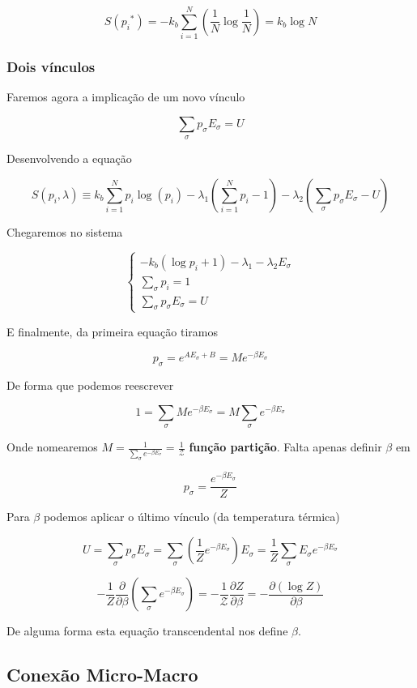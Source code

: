 \[
	S({p_i}^*) = - k_b \sum_{i=1}^{N} \left( \frac{1}{N} \log{\frac{1}{N}} \right) = k_b \log{N}
\]

\subsubsection{Dois vínculos}

Faremos agora a implicação de um novo vínculo

\[
\sum_{\sigma} p_\sigma E_\sigma = U
\]

Desenvolvendo a equação

\[
S({p_i}, \lambda) \equiv k_b \sum_{i=1}^{N} p_i \log{(p_i)} - \lambda_1 \left( \sum_{i=1}^{N}p_i -1 \right)  - \lambda_2 \left( \sum_\sigma  p_\sigma E_\sigma - U \right) 
\]

Chegaremos no sistema


\[
\begin{cases}
	-k_b (\log{p_i} + 1) - \lambda_1 - \lambda_2 E_\sigma \\
	\sum_{\sigma} p_i = 1 \\
	\sum_{\sigma} p_\sigma E_\sigma = U
\end{cases}
\]

E finalmente, da primeira equação tiramos

\[
	p_\sigma = e^{A E_\sigma + B} = M e^{-\beta E_\sigma}
\]

De forma que podemos reescrever

\[
	1 = \sum_\sigma M e^{-\beta E_\sigma} = M \sum_\sigma e^{-\beta E_\sigma}
\]

Onde nomearemos $M = \frac{1}{\sum_{\sigma}e^{-\beta E_\sigma}} = \frac{1}{\mathcal{Z}}$ \textbf{função partição}. Falta apenas definir $\beta$ em

\[
	p_\sigma = \frac{e^{-\beta E_\sigma}}{Z}
\]

Para $\beta$ podemos aplicar o último vínculo (da temperatura térmica)

\[
	U = \sum_\sigma p_\sigma E_\sigma = \sum_\sigma \left( \frac{1}{Z} e^{-\beta E_\sigma} \right) E_\sigma = \frac{1}{Z} \sum_\sigma E_\sigma e^{-\beta E_\sigma}
\]

\[
	-\frac{1}{Z} \frac{\partial }{ \partial \beta} \left( \sum_\sigma e^{-\beta E_\sigma} \right) = -\frac{1}{\mathcal{Z}} \frac{\partial Z}{\partial \beta} = - \frac{\partial (\log{Z})}{\partial \beta}
\]

De alguma forma esta equação transcendental nos define $\beta$.

\subsection{Conexão Micro-Macro}

